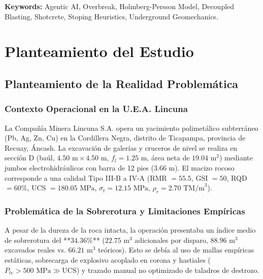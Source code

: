 \documentclass[12pt,a4paper,oneside]{book}
\begin{document}
\textbf{Keywords:} Agentic AI, Overbreak, Holmberg-Persson Model, Decoupled Blasting, Shotcrete, Stoping Heuristics, Underground Geomechanics.

\tableofcontents
\listoftables
\listoffigures

\mainmatter

\chapter{Planteamiento del Estudio}

\section{Planteamiento de la Realidad Problemática}
\subsection{Contexto Operacional en la U.E.A. Lincuna}
La Compañía Minera Lincuna S.A. opera un yacimiento polimetálico subterráneo (Pb, Ag, Zn, Cu) en la Cordillera Negra, distrito de Ticapampa, provincia de Recuay, Áncash. La excavación de galerías y cruceros de nivel se realiza en sección D (baúl, $4.50\text{ m} \times 4.50\text{ m}$, $f_l = 1.25\text{ m}$, área neta de $19.04\text{ m}^2$) mediante jumbos electrohidráulicos con barra de 12 pies ($3.66\text{ m}$). El macizo rocoso corresponde a una calidad Tipo III-B a IV-A (RMR $= 55.5$, GSI $= 50$, RQD $= 60\%$, UCS $= 180.05\text{ MPa}$, $\sigma_t = 12.15\text{ MPa}$, $\rho_r = 2.70\text{ TM/m}^3$).

\subsection{Problemática de la Sobrerotura y Limitaciones Empíricas}
A pesar de la dureza de la roca intacta, la operación presentaba un índice medio de sobrerotura del **$34.36\%$** ($22.75\text{ m}^3$ adicionales por disparo, $88.96\text{ m}^3$ excavados reales vs. $66.21\text{ m}^3$ teóricos). Esto se debía al uso de mallas empíricas estáticas, sobrecarga de explosivo acoplado en corona y hastiales ($P_{te} > 500\text{ MPa} \gg \text{UCS}$) y trazado manual no optimizado de taladros de destrozo.
\end{document}
